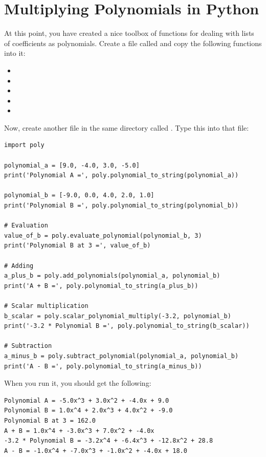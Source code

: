 \chapter{Multiplying Polynomials in Python}

At this point, you have created a nice toolbox of functions for
dealing with lists of coefficients as polynomials. Create a file called  and copy the following functions into it:
\begin{itemize}
\item {}
\item {}
\item {}
\item {}
\item {}
\end{itemize}

Now, create another file in the same directory called . Type this into that file:
\begin{verbatim}
import poly

polynomial_a = [9.0, -4.0, 3.0, -5.0]
print('Polynomial A =', poly.polynomial_to_string(polynomial_a))

polynomial_b = [-9.0, 0.0, 4.0, 2.0, 1.0]
print('Polynomial B =', poly.polynomial_to_string(polynomial_b))

# Evaluation
value_of_b = poly.evaluate_polynomial(polynomial_b, 3)
print('Polynomial B at 3 =', value_of_b)

# Adding
a_plus_b = poly.add_polynomials(polynomial_a, polynomial_b)
print('A + B =', poly.polynomial_to_string(a_plus_b))

# Scalar multiplication
b_scalar = poly.scalar_polynomial_multiply(-3.2, polynomial_b)
print('-3.2 * Polynomial B =', poly.polynomial_to_string(b_scalar))

# Subtraction
a_minus_b = poly.subtract_polynomial(polynomial_a, polynomial_b)
print('A - B =', poly.polynomial_to_string(a_minus_b))
\end{verbatim}

When you run it, you should get the following:
\begin{verbatim}
Polynomial A = -5.0x^3 + 3.0x^2 + -4.0x + 9.0
Polynomial B = 1.0x^4 + 2.0x^3 + 4.0x^2 + -9.0
Polynomial B at 3 = 162.0
A + B = 1.0x^4 + -3.0x^3 + 7.0x^2 + -4.0x
-3.2 * Polynomial B = -3.2x^4 + -6.4x^3 + -12.8x^2 + 28.8
A - B = -1.0x^4 + -7.0x^3 + -1.0x^2 + -4.0x + 18.0
\end{verbatim}


